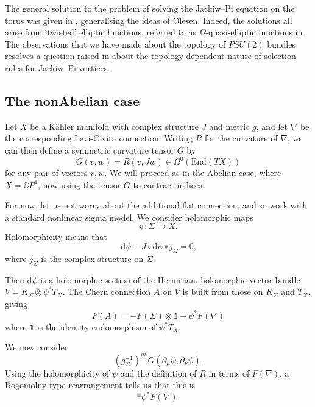 \documentclass[10pt]{article}
\newcommand{\dd}{\textrm{d}}
\theoremstyle{definition}
\begin{document}
The general solution to the problem of solving the Jackiw--Pi equation on the torus was given in \cite{akerblomNCS}, generalising the ideas of Olesen. Indeed, the solutions all arise from `twisted' elliptic functions, referred to as \(\Omega\)-quasi-elliptic functions in \cite{akerblomNCS}. The observations that we have made about the topology of \(PSU(2)\) bundles resolves a question raised in \cite{akerblomNCS} about the topology-dependent nature of selection rules for Jackiw--Pi vortices.

\subsection{The nonAbelian case}
\label{subsec:exnonab}

Let \(X\) be a K\"ahler manifold with complex structure \(J\) and metric \(g\), and let \(\nabla\) be the corresponding Levi-Civita connection. Writing \(R\) for the curvature of \(\nabla\), we can then define a symmetric curvature tensor \(G\) by
\[
G(v,w) = R(v, J w) \in \Omega^0(\text{End}(TX))
\] 
for any pair of vectors \(v,w\). We will proceed as in the Abelian case, where \(X =\mathbb{C}P^1\), now using the tensor \(G\) to contract indices.

For now, let us not worry about the additional flat connection, and so work with a standard nonlinear sigma model. We consider holomorphic maps
\[
\psi : \Sigma \to X \text{.}
\]
Holomorphicity means that
\[
\dd \psi + J \circ \dd \psi \circ j_\Sigma = 0 \text{,}
\]
where \(j_\Sigma\) is the complex structure on \(\Sigma\).

Then \(\dd \psi\) is a holomorphic section of the Hermitian, holomorphic vector bundle \(V = K_\Sigma \otimes \psi^*T_X\). The Chern connection \(A\) on \(V\) is built from those on \(K_\Sigma\) and \(T_X\), giving
\[
F(A) = -F(\Sigma) \otimes \mathbb{1} + \psi^*F(\nabla)
\]
where \(\mathbb{1}\) is the identity endomorphism of \(\psi^*T_X\).

We now consider
\begin{equation}
\label{eq:curvquadratic}
(g_\Sigma^{-1})^{\mu\nu} G(\partial_\mu \psi, \partial_\nu \psi)\text{.}
\end{equation}
Using the holomorphicity of \(\psi\) and the definition of \(R\) in terms of \(F(\nabla)\), a Bogomolny-type rearrangement tells us that this is
\[
* \psi^* F(\nabla) \text{.}
\]
\end{document}
